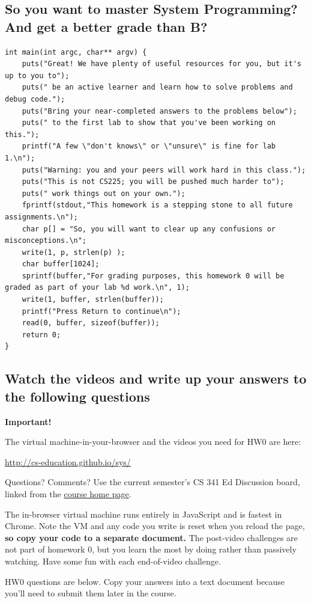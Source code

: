 \subsection{So you want to master System Programming? And get a better grade than B?}

\begin{verbatim}
int main(int argc, char** argv) {
	puts("Great! We have plenty of useful resources for you, but it's up to you to");
	puts(" be an active learner and learn how to solve problems and debug code.");
	puts("Bring your near-completed answers to the problems below");
	puts(" to the first lab to show that you've been working on this.");
	printf("A few \"don't knows\" or \"unsure\" is fine for lab 1.\n");
	puts("Warning: you and your peers will work hard in this class.");
	puts("This is not CS225; you will be pushed much harder to");
	puts(" work things out on your own.");
	fprintf(stdout,"This homework is a stepping stone to all future assignments.\n");
	char p[] = "So, you will want to clear up any confusions or misconceptions.\n";
	write(1, p, strlen(p) );
	char buffer[1024];
	sprintf(buffer,"For grading purposes, this homework 0 will be graded as part of your lab %d work.\n", 1);
	write(1, buffer, strlen(buffer));
	printf("Press Return to continue\n");
	read(0, buffer, sizeof(buffer));
	return 0;
}
\end{verbatim}

\subsection{Watch the videos and write up your answers to the following questions}

\textbf{Important!}

The virtual machine-in-your-browser and the videos you need for HW0 are here:

\url{http://cs-education.github.io/sys/}

Questions? Comments? Use the current semester's CS 341 Ed Discussion board, linked from the \href{https://cs341.cs.illinois.edu/}{course home page}.

The in-browser virtual machine runs entirely in JavaScript and is fastest in Chrome.
Note the VM and any code you write is reset when you reload the page, \textbf{so copy your code to a separate document.}
The post-video challenges are not part of homework 0, but you learn the most by doing rather than passively watching.
Have some fun with each end-of-video challenge.

HW0 questions are below. Copy your answers into a text document because you'll need to submit them later in the course.


